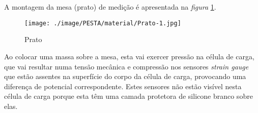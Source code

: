 \\
\\
A montagem da mesa (prato) de medição é apresentada na \textit{figura} \ref{Prato}.
\begin{minipage}[!b]{\linewidth}
\begin{figure}[H]
	\centering
	\texttt{[image: ./image/PESTA/material/Prato-1.jpg]}
	\caption{Prato}
	\label{Prato}
\end{figure}
\end{minipage}
Ao colocar uma massa sobre a mesa, esta vai exercer pressão na célula de carga, que vai resultar numa tensão mecânica e compressão nos sensores \textit{strain gauge} que estão assentes na superfície do corpo da célula de carga, provocando uma diferença de potencial correspondente. Estes sensores não estão visível nesta célula de carga porque esta têm uma camada protetora de silicone branco sobre elas.
